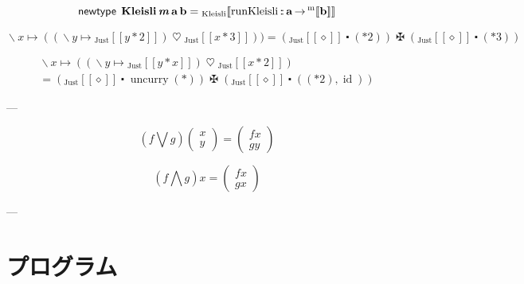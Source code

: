 \documentclass[a5paper,twoside,fleqn,draft]{jsbook}
\def\[{[\![}
\def\]{]\!]}
\newcommand{\mKeyword}[1]{\mathsf{#1}}
\newcommand{\mNewTypeDeclKeyword}{\mKeyword{newtype}}
\DeclareMathOperator{\mNewTypeDecl}{\mNewTypeDeclKeyword}
\newcommand{\mAnonParam}{\diamond}
\newcommand{\mSpecialFunc}[1]{\mathrm{#1}}
\DeclareMathOperator{\mId}{\mSpecialFunc{id}}
\DeclareMathOperator{\mUncurry}{\mSpecialFunc{uncurry}}
\DeclareMathOperator{\mBind}{\heartsuit}
\DeclareMathOperator{\mBindComp}{\maltese}
\DeclareMathOperator{\mCompFunc}{\centerdot}
\DeclareMathOperator{\mFuncArrow}{\rightarrow}
\DeclareMathOperator{\mIn}{{:\!:}}
\DeclareMathOperator{\mLambda}{\backslash}
\DeclareMathOperator{\mLambdaArrow}{\mapsto}
\newcommand{\mType}[1]{\mathbf{#1}} %
\newcommand{\mPolymorphicTypeParameter}[1]{\textbf{\textit{#1}}}
\newcommand{\mA}{\mType{a}}
\newcommand{\mB}{\mType{b}}
\newcommand{\mTypeAssemble}[2]{{}^\mathrm{#1}\[\mType{#2}\]}
\newcommand{\mValueConstructor}[1]{\mathrm{#1}}
\newcommand{\mValueWith}[2]{{}_\mValueConstructor{#1}\[#2\]}
\newcommand{\mJustWith}[1]{\mValueWith{Just}{#1}}
\newcommand{\mPairWith}[2]{\begin{pmatrix}#1\\#2\end{pmatrix}}
\begin{document}
\newcommand{\mKleisliType}{\mType{Kleisli}}
\newcommand{\mKleisliWith}[1]{\mValueWith{Kleisli}{#1}}
\newcommand{\mRunKleisli}{\mathop{\mathrm{runKleisli}}}

\begin{equation}
  \mNewTypeDecl\;
  \mKleisliType\,\mPolymorphicTypeParameter{m}\,\mA\,\mB
  =\mKleisliWith{\mRunKleisli\mIn\mA\mFuncArrow\mTypeAssemble{m}{b}}
\end{equation}

\begin{equation}
  \mLambda x\mLambdaArrow((\mLambda y\mLambdaArrow\mJustWith{y*2})\mBind{}\mJustWith{x*3}))
  =(\mJustWith{\mAnonParam}\mCompFunc(*2))\mBindComp(\mJustWith{\mAnonParam}\mCompFunc(*3))
\end{equation}

\begin{multline}
  \mLambda x\mLambdaArrow((\mLambda y\mLambdaArrow\mJustWith{y*x})\mBind{}\mJustWith{x*2})\\
  =(\mJustWith{\mAnonParam}\mCompFunc\mUncurry(*))\mBindComp(\mJustWith{\mAnonParam}\mCompFunc{}((*2),\mId))
\end{multline}

---

\begin{equation}
  \left(f\bigvee g\right)\mPairWith{x}{y}=\mPairWith{fx}{gy}
\end{equation}

\begin{equation}
  \left(f\bigwedge g\right)x=\mPairWith{fx}{gx}
\end{equation}

---




\chapter{プログラム}
\label{ch:program}
\end{document}
